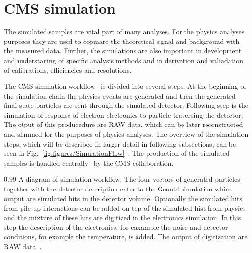 
\clearpage

\setcounter{secnumdepth}{4}
\setcounter{secnumdepth}{5}


\section{CMS simulation}

The simulated samples are vital part of many analyses. For the physics analyses purposes they are used to copmare the theoretical signal and background with the measured data.  Further, the simulations are also important in development and understaning of specific analysis methods and in derivation and valiadation of calibrations, efficiencies and resolutions.


The CMS simulation workflow~\cite{Banerjee:2007zz, Hildreth:2017vpw, Hildreth:2015kps, website:simuBasics } is divided into several steps. At the beginning of the simulation chain the physics events are generated and then the generated final state particles are sent through the simulated detector. Following step is the simulation of response of electron electronics to particle traversing the detector. The otput of this producedure are RAW data, which can be later reconstructed and slimmed for the purposes of physics analyses. The overview of the simulation steps, which will be described in larger detail in following subsections, can be seen in Fig.~\ref{fig:figures/SimulationFlow}~\cite{website:simuBasics}. The production of the simulated samples is handled centrally~\cite{Boudoul:2015bkp} by the CMS collaboration.

                 {0.99}       %
                 { A diagram of simulation workflow. The four-vectors of generated particles together with the detector description enter to the Geant4 simulation which output are simulated hits in the detector volume. Optionally the simulated hits from pile-up interactions can be added on top of the simulated hist from physics and the mixture of these hits are digitized in the electronics simulation. In this step the description of the electronics, for eaxample the noise and detector conditions, for example the temperature, is added. The output of digitization are RAW data~\cite{website:simuBasics}. }

